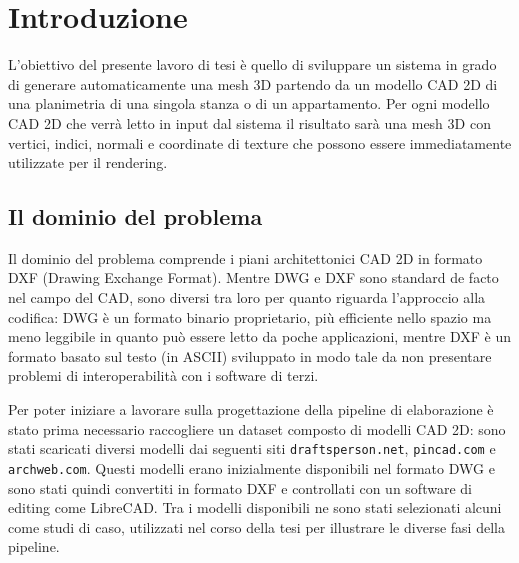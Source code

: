 \chapter{Introduzione}
\label{ch:1_introduzione}

L'obiettivo del presente lavoro di tesi è quello di sviluppare un sistema in grado di generare automaticamente una mesh 3D partendo da un modello CAD 2D di una planimetria di una singola stanza o di un appartamento. Per ogni modello CAD 2D che verrà letto in input dal sistema il risultato sarà una mesh 3D con vertici, indici, normali e coordinate di texture che possono essere immediatamente utilizzate per il rendering.


\section{Il dominio del problema}
\label{sec:dominio_del_problema}

Il dominio del problema comprende i piani architettonici CAD 2D in formato DXF (Drawing Exchange Format). Mentre DWG e DXF sono standard de facto nel campo del CAD, sono diversi tra loro per quanto riguarda l'approccio alla codifica: DWG è un formato binario proprietario, più efficiente nello spazio ma meno leggibile in quanto può essere letto da poche applicazioni, mentre DXF è un formato basato sul testo (in ASCII) sviluppato in modo tale da non presentare problemi di interoperabilità con i software di terzi.

Per poter iniziare a lavorare sulla progettazione della pipeline di elaborazione è stato prima necessario raccogliere un dataset composto di modelli CAD 2D: sono stati scaricati diversi modelli dai seguenti siti \texttt{draftsperson.net}, \texttt{pincad.com} e \texttt{archweb.com}. Questi modelli erano inizialmente disponibili nel formato DWG e sono stati quindi convertiti in formato DXF e controllati con un software di editing come LibreCAD. Tra i modelli disponibili ne sono stati selezionati alcuni come studi di caso, utilizzati nel corso della tesi per illustrare le diverse fasi della pipeline.


